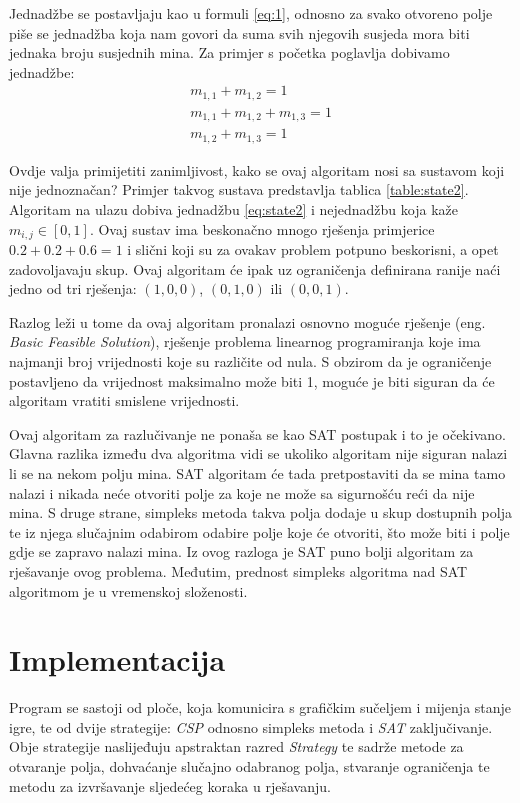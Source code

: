 \documentclass{article}
\begin{document}
Jednadžbe se postavljaju kao u formuli \ref{eq:1}, odnosno za svako otvoreno polje piše se jednadžba koja nam govori da suma svih njegovih susjeda mora biti jednaka broju susjednih mina. Za primjer s početka poglavlja dobivamo jednadžbe:
\begin{gather*}
\label{csp}
    m_{1, 1} + m_{1, 2} = 1 \\
    m_{1, 1} + m_{1, 2}+ m_{1, 3} = 1 \\
    m_{1, 2} + m_{1, 3} = 1
\end{gather*}

Ovdje valja primijetiti zanimljivost, kako se ovaj algoritam nosi sa sustavom koji nije
jednoznačan? Primjer takvog sustava predstavlja tablica \ref{table:state2}. Algoritam na ulazu
dobiva jednadžbu \ref{eq:state2} i nejednadžbu koja kaže $m_{i, j} \in [0, 1]$. Ovaj sustav
ima beskonačno mnogo rješenja primjerice $0.2 + 0.2 + 0.6 = 1$ i slični koji su za ovakav
problem potpuno beskorisni, a opet zadovoljavaju skup. Ovaj algoritam će ipak uz ograničenja
definirana ranije naći jedno od tri rješenja: $(1, 0, 0)$, $(0, 1, 0)$ ili $(0, 0, 1)$.

Razlog leži u tome da ovaj algoritam pronalazi osnovno moguće rješenje (eng. \textit{Basic Feasible Solution}), rješenje problema linearnog programiranja koje ima najmanji broj vrijednosti
koje su različite od nula. S obzirom da je ograničenje postavljeno da vrijednost maksimalno
može biti 1, moguće je biti siguran da će algoritam vratiti smislene vrijednosti.


Ovaj algoritam za razlučivanje ne ponaša se kao SAT postupak i to je očekivano. Glavna razlika
između dva algoritma vidi se ukoliko algoritam nije siguran nalazi li se na nekom polju
mina. SAT algoritam će tada pretpostaviti da se mina tamo nalazi i nikada neće otvoriti polje za koje ne može sa sigurnošću reći da nije mina. S druge strane, simpleks metoda takva polja dodaje u skup dostupnih polja te iz njega slučajnim odabirom odabire polje koje će otvoriti, što može biti i polje gdje se zapravo nalazi mina. Iz ovog razloga je SAT puno bolji algoritam za rješavanje
ovog problema. Međutim, prednost simpleks algoritma nad SAT algoritmom je u vremenskoj složenosti.

\section{Implementacija}

Program se sastoji od ploče, koja komunicira s grafičkim sučeljem i mijenja stanje igre, te od dvije strategije: \textit{CSP} odnosno simpleks metoda i \textit{SAT} zaključivanje.
Obje strategije naslijeđuju apstraktan razred \textit{Strategy} te sadrže metode za otvaranje polja, dohvaćanje slučajno odabranog polja, stvaranje ograničenja te metodu za izvršavanje sljedećeg koraka u rješavanju.
\end{document}
